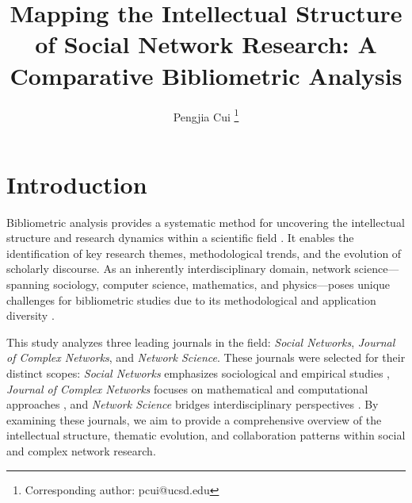 \documentclass[twocolumn]{article}
\title{\textbf{Mapping the Intellectual Structure of Social Network Research: A Comparative Bibliometric Analysis}}
\author{Pengjia Cui \thanks{Corresponding author: pcui@ucsd.edu}}
\affil{Computational Social Science \\
	University of California San Diego}
\date{}
\begin{document}
	

	\section{Introduction}\label{Introduction}
	
	Bibliometric analysis provides a systematic method for uncovering the intellectual structure and research dynamics within a scientific field \cite{donthu2021bibliometric,arias2020bibliometric, WOS:001124720500001, WOS:000208374100011}. It enables the identification of key research themes, methodological trends, and the evolution of scholarly discourse. As an inherently interdisciplinary domain, network science—spanning sociology, computer science, mathematics, and physics—poses unique challenges for bibliometric studies due to its methodological and application diversity \cite{newman2018networks,barabasi2016network}.
	
	This study analyzes three leading journals in the field: \textit{Social Networks}, \textit{Journal of Complex Networks}, and \textit{Network Science}. These journals were selected for their distinct scopes: \textit{Social Networks} emphasizes sociological and empirical studies \cite{wasserman1994social}, \textit{Journal of Complex Networks} focuses on mathematical and computational approaches \cite{boccaletti2006complex}, and \textit{Network Science} bridges interdisciplinary perspectives \cite{newman2010networks}. By examining these journals, we aim to provide a comprehensive overview of the intellectual structure, thematic evolution, and collaboration patterns within social and complex network research.
	
\end{document}
